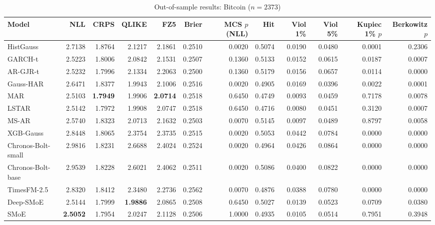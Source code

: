 \begin{table}[!htbp]\centering\scriptsize
\caption{Out-of-sample results: Bitcoin ($n=2373$)}\label{tab:asset_btc}
\begin{adjustbox}{max width=\textwidth}
\begin{tabular}{lrrrrrrrrrrr}
\toprule
Model & NLL & CRPS & QLIKE & FZ5 & Brier & MCS $p$ (NLL) & Hit & Viol 1\% & Viol 5\% & Kupiec 1\% $p$ & Berkowitz $p$\\
\midrule
HistGauss & 2.7138 & 1.8764 & 2.1217 & 2.1861 & 0.2510 & 0.0020 & 0.5074 & 0.0190 & 0.0480 & 0.0001 & 0.2306\\
GARCH-t & 2.5223 & 1.8006 & 2.0842 & 2.1531 & 0.2507 & 0.1360 & 0.5133 & 0.0152 & 0.0615 & 0.0187 & 0.0007\\
AR-GJR-t & 2.5232 & 1.7996 & 2.1334 & 2.2063 & 0.2500 & 0.1360 & 0.5179 & 0.0156 & 0.0657 & 0.0114 & 0.0000\\
Gauss-HAR & 2.6471 & 1.8377 & 1.9943 & 2.1006 & 0.2516 & 0.0020 & 0.4905 & 0.0169 & 0.0396 & 0.0022 & 0.0001\\
MAR & 2.5103 & \textbf{1.7949} & 1.9906 & \textbf{2.0714} & 0.2518 & 0.6450 & 0.4749 & 0.0093 & 0.0459 & 0.7178 & 0.0078\\
LSTAR & 2.5142 & 1.7972 & 1.9908 & 2.0747 & 0.2518 & 0.6450 & 0.4716 & 0.0080 & 0.0451 & 0.3120 & 0.0007\\
MS-AR & 2.5740 & 1.8323 & 2.0713 & 2.1632 & 0.2503 & 0.0070 & 0.5145 & 0.0097 & 0.0489 & 0.8797 & 0.0058\\
XGB-Gauss & 2.8448 & 1.8065 & 2.3754 & 2.3735 & 0.2515 & 0.0020 & 0.5053 & 0.0442 & 0.0784 & 0.0000 & 0.0000\\
Chronos-Bolt-small & 2.9816 & 1.8231 & 2.6688 & 2.4024 & 0.2524 & 0.0020 & 0.4964 & 0.0426 & 0.0864 & 0.0000 & 0.0000\\
Chronos-Bolt-base & 2.9539 & 1.8228 & 2.6021 & 2.4062 & 0.2511 & 0.0020 & 0.5086 & 0.0400 & 0.0822 & 0.0000 & 0.0000\\
TimesFM-2.5 & 2.8320 & 1.8412 & 2.3480 & 2.2736 & 0.2562 & 0.0070 & 0.4876 & 0.0388 & 0.0780 & 0.0000 & 0.0000\\
Deep-SMoE & 2.5144 & 1.7999 & \textbf{1.9886} & 2.0865 & 0.2508 & 0.6450 & 0.5027 & 0.0139 & 0.0523 & 0.0709 & 0.0380\\
SMoE & \textbf{2.5052} & 1.7954 & 2.0247 & 2.1128 & 0.2506 & 1.0000 & 0.4935 & 0.0105 & 0.0514 & 0.7951 & 0.3948\\
\bottomrule
\end{tabular}
\end{adjustbox}
\end{table}